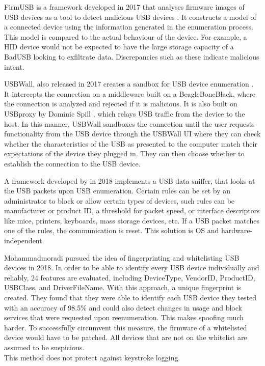 FirmUSB is a framework developed in 2017 that analyses firmware images of USB devices as a tool to detect malicious USB devices \cite{hernandezFirmUSBVettingUSB2017}. It constructs a model of a connected device using the information generated in the enumeration process. This model is compared to the actual behaviour of the device. For example, a HID device would not be expected to have the large storage capacity of a BadUSB looking to exfiltrate data. Discrepancies such as these indicate malicious intent. 

USBWall, also released in 2017 creates a sandbox for USB device enumeration \cite{kangUSBWallNovelSecurity2017}. It intercepts the connection on a middleware built on a BeagleBoneBlack, where the connection is analyzed and rejected if it is malicious. It is also built on USBproxy by Dominic Spill \cite{dominicspillShmooCon2014Open2014}, which relays USB traffic from the device to the host. In this manner, USBWall sandboxes the connection until the user requests functionality from the USB device through the USBWall UI where they can check whether the characteristics of the USB as presented to the computer match their expectations of the device they plugged in. They can then choose whether to establish the connection to the USB device.  

A framework developed by \cite{erdinOSIndependentHardwareAssisted2018} in 2018 implements a USB data sniffer, that looks at the USB packets upon USB enumeration. Certain rules can be set by an administrator to block or allow certain types of devices, such rules can be manufacturer or product ID, a threshold for packet speed, or interface descriptors like mice, printers, keyboards, mass storage devices, etc. If a USB packet matches one of the rules, the communication is reset. This solution is OS and hardware-independent. 

Mohammadmoradi \cite{mohammadmoradiMakingWhitelistingBaseddefence2018} pursued the idea of fingerprinting and whitelisting USB devices in 2018. In order to be able to identify every USB device individually and reliably, 24 features are evaluated, including DeviceType, VendorID, ProductID, USBClass, and DriverFileName. With this approach, a unique fingerprint is created. They found that they were able to identify each USB device they tested with an accuracy of 98.5\%  and could also detect changes in usage and block services that were requested upon reenumeration. This makes spoofing much harder. To successfully circumvent this measure, the firmware of a whitelisted device would have to be patched. All devices that are not on the whitelist are assumed to be suspicious. \\
This method does not protect against keystroke logging. 

